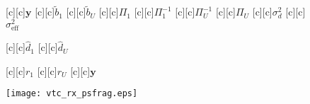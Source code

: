 \documentclass{article}
\begin{document}
\begin{figure}[htb]
  \begin{center}

        [c][c]{$\mathrm{\mathbf{y}}$}
        [c][c]{$\tilde{b}_1$}
        [c][c]{$\tilde{b}_U$}
        [c][c]{$\Pi_1$}
        [c][c]{$\Pi_1^{-1}$}
        [c][c]{$\Pi_U^{-1}$}
        [c][c]{$\Pi_U$}
        [c][c]{$\sigma_d^2$}
        [c][c]{$\sigma_{\mathrm{eff}}^2$}
	
	[c]{$\hat{d}_1$}
        [c][c]{$\hat{d}_U$}
	

        [c][c]{$r_1$}
	[c]{$r_U$}
	[c]{$\mathrm{\mathbf{y}}$}


    \texttt{[image: vtc\_rx\_psfrag.eps]}
    \end{center}
\end{figure}
\end{document}
